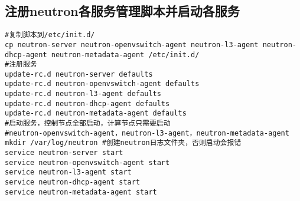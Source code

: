 \documentclass[a4paper,left=1.5cm,right=1.5cm,11pt]{article}
\begin{document}
\subsection{注册neutron各服务管理脚本并启动各服务}
\begin{lstlisting}
#复制脚本到/etc/init.d/
cp neutron-server neutron-openvswitch-agent neutron-l3-agent neutron-dhcp-agent neutron-metadata-agent /etc/init.d/
#注册服务
update-rc.d neutron-server defaults
update-rc.d neutron-openvswitch-agent defaults
update-rc.d neutron-l3-agent defaults
update-rc.d neutron-dhcp-agent defaults
update-rc.d neutron-metadata-agent defaults
#启动服务，控制节点全部启动，计算节点只需要启动
#neutron-openvswitch-agent，neutron-l3-agent，neutron-metadata-agent
mkdir /var/log/neutron #创建neutron日志文件夹，否则启动会报错
service neutron-server start
service neutron-openvswitch-agent start
service neutron-l3-agent start
service neutron-dhcp-agent start
service neutron-metadata-agent start
\end{lstlisting}			
\end{document}
